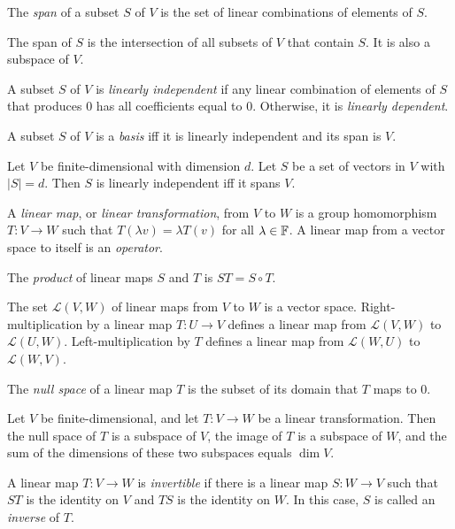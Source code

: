 \begin{defn}
  The \emph{span} of a subset $S$ of $V$ is the set of linear combinations of
  elements of $S$.
\end{defn}
\begin{prop}
  The span of $S$ is the intersection of all subsets of $V$ that contain $S$.
  It is also a subspace of $V$.
\end{prop}
\begin{defn}
  A subset $S$ of $V$ is \emph{linearly independent} if any linear combination
  of elements of $S$ that produces $ 0$ has all coefficients equal to $0$.
  Otherwise, it is \emph{linearly dependent}.
\end{defn}
\begin{prop}
  A subset $S$ of $V$ is a \emph{basis} iff it is linearly independent and its
  span is $V$.
\end{prop}
\begin{prop}
  Let $V$ be finite-dimensional with dimension $d$.
  Let $S$ be a set of vectors in $V$ with $|S|=d$. Then $S$ is linearly
  independent iff it spans $V$.
\end{prop}
\begin{defn}
  A \emph{linear map}, or \emph{linear transformation}, from $V$ to $W$ is a group homomorphism
  $T:V\to W$ such that $T(\lambda v)=\lambda T(v)$ for all $\lambda\in\mathbb{F}$. A
  linear map from a vector space to itself is an \emph{operator}.

  The \emph{product} of linear maps $S$ and $T$ is $ST=S\circ T$.
\end{defn}
\begin{prop}
  The set $\mathcal L(V,W)$ of linear maps from $V$ to $W$ is a vector space.
  Right-multiplication by a linear map $T:U\to V$ defines a linear map from $\mathcal
  L(V,W)$ to $\mathcal L(U,W)$. Left-multiplication by $T$ defines a linear map
  from $\mathcal L(W,U)$ to $\mathcal L(W,V)$.
\end{prop}
\begin{defn}
  The \emph{null space} of a linear map $T$ is the subset of its domain that $T$
  maps to 0.
\end{defn}
\begin{prop}
  Let $V$ be finite-dimensional, and
  let $T:V\to W$ be a linear transformation. Then the null space of $T$ is a
  subspace of $V$, the image of $T$ is a subspace of $W$, and the sum of the
  dimensions of these two subspaces equals $\dim V$.
\end{prop}
\begin{defn}
  A linear map $T:V\to W$ is \emph{invertible} if there is a linear map $S:W\to
  V$ such that $ST$ is the identity on $V$ and $TS$ is the identity on $W$. In
  this case, $S$ is called an \emph{inverse} of $T$.
\end{defn}
